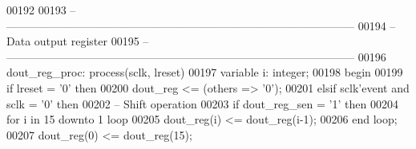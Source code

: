 \begin{DoxyCode}
00192 
00193 \textcolor{keyword}{    -- ---------------------------------------------------------------------------------------------}
00194 \textcolor{keyword}{    -- Data output register}
00195 \textcolor{keyword}{    -- ---------------------------------------------------------------------------------------------}
00196     dout\_reg\_proc: \textcolor{keywordflow}{process}(sclk, lreset)
00197         \textcolor{keywordflow}{variable} \textcolor{vhdlchar}{i}\textcolor{vhdlchar}{:} \textcolor{comment}{integer};
00198 \textcolor{vhdlkeyword}{    begin}
00199         \textcolor{keywordflow}{if} \textcolor{vhdlchar}{lreset} \textcolor{vhdlchar}{=} \textcolor{vhdlchar}{'}\textcolor{vhdllogic}{}\textcolor{vhdllogic}{0}\textcolor{vhdlchar}{'} \textcolor{keywordflow}{then}
00200             \textcolor{vhdlchar}{dout_reg} \textcolor{vhdlchar}{<=} \textcolor{vhdlchar}{(}\textcolor{keywordflow}{others} \textcolor{vhdlchar}{=}\textcolor{vhdlchar}{>} \textcolor{vhdlchar}{'}\textcolor{vhdllogic}{}\textcolor{vhdllogic}{0}\textcolor{vhdlchar}{'}\textcolor{vhdlchar}{)};
00201         \textcolor{keywordflow}{elsif} \textcolor{vhdlchar}{sclk}\textcolor{vhdlchar}{'}\textcolor{vhdlkeyword}{event} \textcolor{keywordflow}{and} \textcolor{vhdlchar}{sclk} \textcolor{vhdlchar}{=} \textcolor{vhdlchar}{'}\textcolor{vhdllogic}{}\textcolor{vhdllogic}{0}\textcolor{vhdlchar}{'} \textcolor{keywordflow}{then}
00202 \textcolor{keyword}{            -- Shift operation}
00203             \textcolor{keywordflow}{if} \textcolor{vhdlchar}{dout_reg_sen} \textcolor{vhdlchar}{=} \textcolor{vhdlchar}{'}\textcolor{vhdllogic}{}\textcolor{vhdllogic}{1}\textcolor{vhdlchar}{'} \textcolor{keywordflow}{then}
00204                 \textcolor{keywordflow}{for} \textcolor{vhdlchar}{i} \textcolor{keywordflow}{in} \textcolor{vhdllogic}{}\textcolor{vhdllogic}{15} \textcolor{keywordflow}{downto} \textcolor{vhdllogic}{}\textcolor{vhdllogic}{1} \textcolor{keywordflow}{loop}
00205                     \textcolor{vhdlchar}{dout_reg}\textcolor{vhdlchar}{(}\textcolor{vhdlchar}{i}\textcolor{vhdlchar}{)} \textcolor{vhdlchar}{<=} \textcolor{vhdlchar}{dout_reg}\textcolor{vhdlchar}{(}\textcolor{vhdlchar}{i}\textcolor{vhdlchar}{-}\textcolor{vhdllogic}{}\textcolor{vhdllogic}{1}\textcolor{vhdlchar}{)};
00206                 \textcolor{keywordflow}{end} \textcolor{keywordflow}{loop};
00207                 \textcolor{vhdlchar}{dout_reg}\textcolor{vhdlchar}{(}\textcolor{vhdllogic}{}\textcolor{vhdllogic}{0}\textcolor{vhdlchar}{)} \textcolor{vhdlchar}{<=} \textcolor{vhdlchar}{dout_reg}\textcolor{vhdlchar}{(}\textcolor{vhdllogic}{}\textcolor{vhdllogic}{15}\textcolor{vhdlchar}{)};

\end{DoxyCode}
